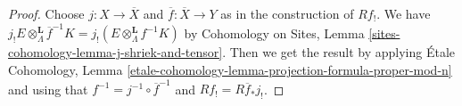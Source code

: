 \documentclass{stacks-project}
\theoremstyle{plain}
\theoremstyle{definition}
\theoremstyle{remark}
\numberwithin{equation}{subsection}
\begin{document}
\begin{proof}
Choose $j : X \to \overline{X}$ and $\overline{f} : \overline{X} \to Y$
as in the construction of $Rf_!$. We have
$j_!E \otimes_\Lambda^\mathbf{L} \overline{f}^{-1}K =
j_!(E \otimes_\Lambda^\mathbf{L} f^{-1}K)$ by
Cohomology on Sites, Lemma \ref{sites-cohomology-lemma-j-shriek-and-tensor}.
Then we get the result by applying
\'Etale Cohomology, Lemma
\ref{etale-cohomology-lemma-projection-formula-proper-mod-n}
and using that $f^{-1} = j^{-1} \circ \overline{f}^{-1}$ and
$Rf_! = R\overline{f}_*j_!$.
\end{proof}
\end{document}
